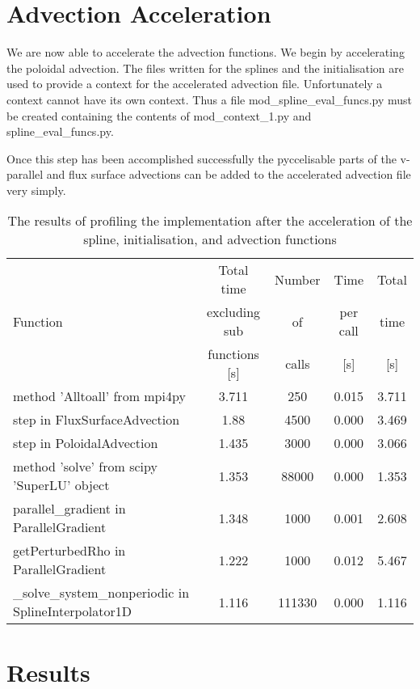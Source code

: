 \section{Advection Acceleration}

We are now able to accelerate the advection functions. We begin by accelerating the poloidal advection. The files written for the splines and the initialisation are used to provide a context for the accelerated advection file. Unfortunately a context cannot have its own context. Thus a file mod\_spline\_eval\_funcs.py must be created containing the contents of mod\_context\_1.py and spline\_eval\_funcs.py.

Once this step has been accomplished successfully the pyccelisable parts of the v-parallel and flux surface advections can be added to the accelerated advection file very simply.

\begin{table}[ht]
\centering
 \begin{tabular}{|m{}|c|c|c|c|}
  \hline
          & Total time & Number & Time & Total \\
  Function & excluding sub & of & per call & time \\
          & functions [s] & calls & [s] & [s] \\
  \hline
  \hline
  method 'Alltoall' from mpi4py & 3.711 & 250 & 0.015 & 3.711 \\
  \hline
  step in FluxSurfaceAdvection & 1.88 & 4500 & 0.000 & 3.469 \\
  \hline
  step in PoloidalAdvection & 1.435 & 3000 & 0.000 & 3.066\\
  \hline
  method 'solve' from scipy 'SuperLU' object & 1.353 & 88000 & 0.000 & 1.353\\
  \hline
  parallel\_gradient in ParallelGradient & 1.348 & 1000 & 0.001 & 2.608\\
  \hline
  getPerturbedRho in ParallelGradient & 1.222 & 1000 & 0.012 & 5.467\\
  \hline
  \_solve\_system\_nonperiodic in SplineInterpolator1D & 1.116 & 111330 & 0.000 & 1.116\\
  \hline
 \end{tabular}
 \caption{\label{tab::adv profile} The results of profiling the implementation after the acceleration of the spline, initialisation, and advection functions}
\end{table}

\section{Results}

